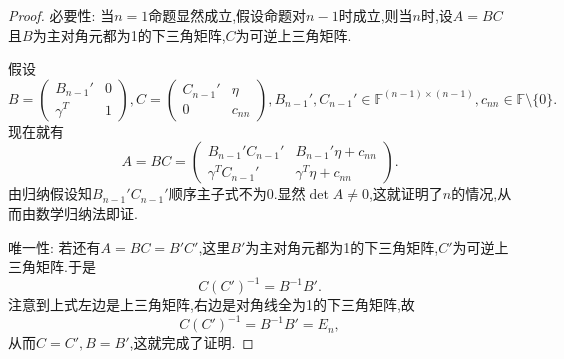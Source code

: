 \documentclass[../../main.tex]{subfiles}%
\begin{document}
\begin{proof}
{\heiti 必要性:} 当\(n = 1\)命题显然成立,假设命题对\(n - 1\)时成立,则当\(n\)时,设\(A = BC\)且\(B\)为主对角元都为1的下三角矩阵,\(C\)为可逆上三角矩阵.

假设
\[
B = \begin{pmatrix}
B_{n - 1}' & 0 \\
\gamma^T & 1
\end{pmatrix}, C = \begin{pmatrix}
C_{n - 1}' & \eta \\
0 & c_{nn}
\end{pmatrix}, B_{n - 1}', C_{n - 1}' \in \mathbb{F}^{(n - 1) \times (n - 1)}, c_{nn} \in \mathbb{F} \setminus \{0\}.
\]
现在就有
\[
A = BC = \begin{pmatrix}
B_{n - 1}' C_{n - 1}' & B_{n - 1}' \eta + c_{nn} \\
\gamma^T C_{n - 1}' & \gamma^T \eta + c_{nn}
\end{pmatrix}.
\]
由归纳假设知\(B_{n - 1}' C_{n - 1}'\)顺序主子式不为0.显然\(\det A \neq 0\),这就证明了\(n\)的情况,从而由数学归纳法即证.

{\heiti 唯一性:} 若还有\(A = BC = B'C'\),这里\(B'\)为主对角元都为1的下三角矩阵,\(C'\)为可逆上三角矩阵.于是
\[
C (C')^{-1} = B^{-1} B'.
\]
注意到上式左边是上三角矩阵,右边是对角线全为1的下三角矩阵,故
\[
C (C')^{-1} = B^{-1} B' = E_n,
\]
从而\(C = C', B = B'\),这就完成了证明.
\end{proof}
\end{document}
